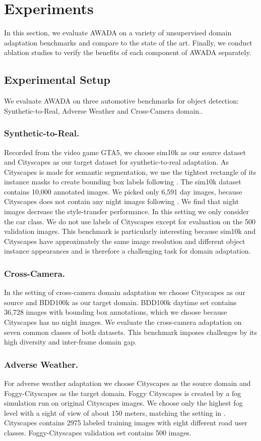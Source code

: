 \documentclass[10pt,twocolumn,letterpaper]{article}
\begin{document}
\section{Experiments}
In this section, we evaluate AWADA on a variety of unsupervised domain adaptation benchmarks and compare to the state of the art. Finally, we conduct ablation studies to verify the benefits of each component of AWADA separately.

\subsection{Experimental Setup}
We evaluate AWADA on three automotive benchmarks for object detection: Synthetic-to-Real, Adverse Weather and Cross-Camera domain..
\subsubsection{Synthetic-to-Real.} Recorded from the video game GTA5, we choose sim10k \cite{sim10k} as our source dataset and Cityscapes \cite{Cityscapes} as our target dataset for synthetic-to-real adaptation. As Cityscapes is made for semantic segmentation, we use the tightest rectangle of its instance masks to create bounding box labels following \cite{DAFasterRCNN}. The sim10k dataset contains 10,000 annotated images. We picked only 6,591 day images, because Cityscapes does not contain any night images following \cite{menke2022}. We find that night images decrease the style-transfer performance. In this setting we only consider the car class. We do not use labels of Cityscapes except for evaluation on the 500 validation images. This benchmark is particularly interesting because sim10k and Cityscapes have approximately the same image resolution and different object instance appearances and is therefore a challenging task for domain adaptation.
\subsubsection{Cross-Camera.} 
In the setting of cross-camera domain adaptation we choose Cityscapes as our source and BDD100k \cite{bdd100k} as our target domain. BDD100k daytime set contains 36,728 images with bounding box annotations, which we choose because Cityscapes has no night images. We evaluate the cross-camera adaptation on seven common classes of both datasets. This benchmark imposes challenges by its high diversity and inter-frame domain gap.

\subsubsection{Adverse Weather.} For adverse weather adaptation we choose Cityscapes \cite{Cityscapes} as the source domain and Foggy-Cityscapes \cite{FoggyCityscapes} as the target domain. Foggy Cityscapes is created by a fog simulation run on original Cityscapes images. We choose only the highest fog level with a sight of view of about 150 meters, matching the setting in \cite{SeekingSimilarities}. Cityscapes contains 2975 labeled training images with eight different road user classes. Foggy-Cityscapes validation set contains 500 images.
\end{document}
